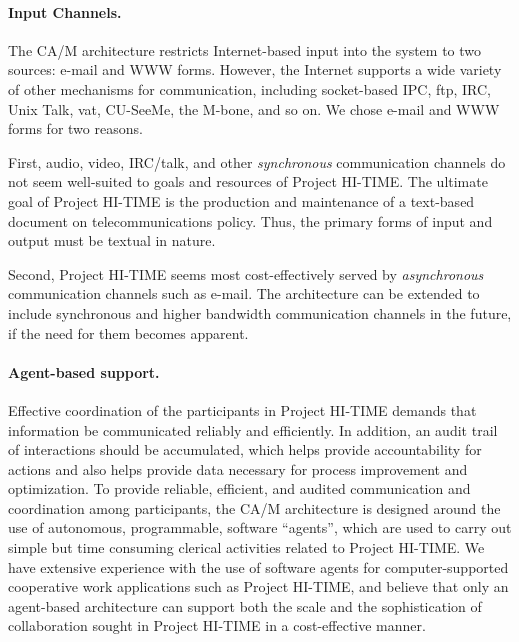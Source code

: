 \paragraph{Input Channels.}  
The CA/M architecture restricts Internet-based input into the system to two
sources: e-mail and WWW forms.  However, the Internet supports a wide
variety of other mechanisms for communication, including socket-based IPC,
ftp, IRC, Unix Talk, vat, CU-SeeMe, the M-bone, and so on.  We chose e-mail
and WWW forms for two reasons.

First, audio, video, IRC/talk, and other {\em synchronous\/} communication
channels do not seem well-suited to goals and resources of Project HI-TIME.
The ultimate goal of Project HI-TIME is the production and maintenance of a
text-based document on telecommunications policy. Thus, the primary forms
of input and output must be textual in nature.

Second, Project HI-TIME seems most cost-effectively served by {\em
asynchronous} communication channels such as e-mail.  The architecture can
be extended to include synchronous and higher bandwidth communication
channels in the future, if the need for them becomes apparent.

\paragraph{Agent-based support.}
Effective coordination of the participants in Project HI-TIME demands that
information be communicated reliably and efficiently.  In addition, an
audit trail of interactions should be accumulated, which helps provide
accountability for actions and also helps provide data necessary for
process improvement and optimization.  To provide reliable, efficient, and
audited communication and coordination among participants, the CA/M
architecture is designed around the use of autonomous, programmable,
software ``agents'', which are used to carry out simple but time consuming
clerical activities related to Project HI-TIME.  We have extensive
experience with the use of software agents for computer-supported
cooperative work applications such as Project HI-TIME, and believe that
only an agent-based architecture can support both the scale and the
sophistication of collaboration sought in Project HI-TIME in a
cost-effective manner.

